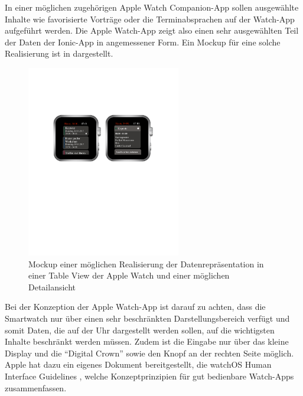 In einer möglichen zugehörigen Apple Watch Companion-App sollen ausgewählte Inhalte wie favorisierte Vorträge oder die Terminabsprachen auf der Watch-App aufgeführt werden. Die Apple Watch-App zeigt also einen sehr ausgewählten Teil der Daten der Ionic-App in angemessener Form. Ein Mockup für eine solche Realisierung ist in  dargestellt. 

\begin{figure}[htb] 
	\centering
	\includegraphics[width=0.6\textwidth]{data/bilder/AppleWatchMockup.pdf}
	\caption{Mockup einer möglichen Realisierung der Datenrepräsentation in einer Table View der Apple Watch und einer möglichen Detailansicht}
	\label{fig:AppleWatchMockup}
\end{figure}

Bei der Konzeption der Apple Watch-App ist darauf zu achten, dass die Smartwatch nur über einen sehr beschränkten Darstellungsbereich verfügt und somit Daten, die auf der Uhr dargestellt werden sollen, auf die wichtigsten Inhalte beschränkt werden müssen. Zudem ist die Eingabe nur über das kleine Display und die \enquote{Digital Crown} sowie den Knopf an der rechten Seite möglich. Apple hat dazu ein eigenes Dokument bereitgestellt, die watchOS Human Interface Guidelines \cite{appleWatchInterfaceGuidelines}, welche Konzeptprinzipien für gut bedienbare Watch-Apps zusammenfassen.


